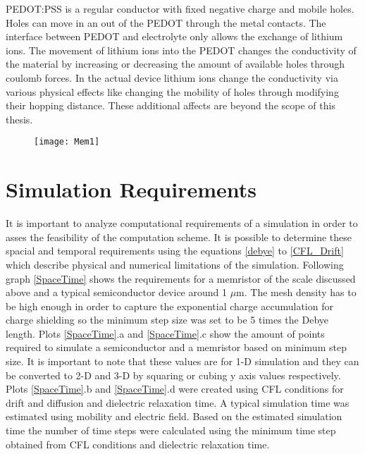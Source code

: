 PEDOT:PSS is a regular conductor with fixed negative charge and mobile holes. Holes can move in an out of the PEDOT through the metal contacts. The interface between PEDOT and electrolyte only allows the exchange of lithium ions. The movement of lithium ions into the PEDOT changes the conductivity of the material by increasing or decreasing the amount of available holes through coulomb forces. In the actual device lithium ions change the conductivity via various physical effects like changing the mobility of holes through modifying their hopping distance. These additional affects are beyond the scope of this thesis. 


\begin{figure}[!htp]
\centering
\texttt{[image: Mem1]}
\caption{} 
\label{MemStc}
\end{figure}

\clearpage
\section{Simulation Requirements}

It is important to analyze computational requirements of a simulation in order to asses the feasibility of the computation scheme. It is possible to determine these spacial and temporal requirements using the equations \ref{debye} to \ref{CFL_Drift} which describe physical and numerical limitations of the simulation. Following graph \ref{SpaceTime} shows the requirements for a memristor of the scale discussed above and a typical semiconductor device around 1 $\mu$m. The mesh density has to be high enough in order to capture the exponential charge accumulation for charge shielding so the minimum step size was set to be 5 times the Debye length. Plots \ref{SpaceTime}.a and \ref{SpaceTime}.c show the amount of points required to simulate a semiconductor and a memristor based on minimum step size. It is important to note that these values are for 1-D simulation and they can be converted to 2-D and 3-D by squaring or cubing y axis values respectively. Plots \ref{SpaceTime}.b and \ref{SpaceTime}.d were created using CFL conditions for drift and diffusion and dielectric relaxation time. A typical simulation time was estimated using mobility and electric field. Based on the estimated simulation time the number of time steps were calculated using the minimum time step obtained from CFL conditions and dielectric relaxation time.

